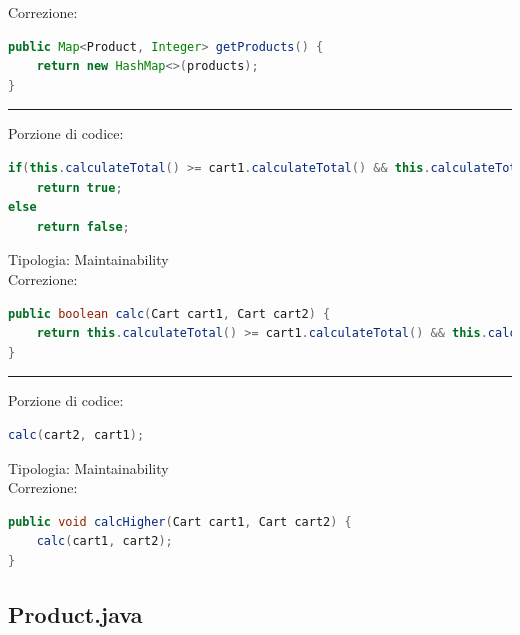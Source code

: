 \documentclass{article}
\begin{document}
Correzione: 
\begin{lstlisting}[language=Java]
public Map<Product, Integer> getProducts() {
    return new HashMap<>(products);
}
\end{lstlisting}
\vspace{.5em}\hrule\vspace{.5em}
Porzione di codice:
\begin{lstlisting}[language=Java]
if(this.calculateTotal() >= cart1.calculateTotal() && this.calculateTotal() >= cart2.calculateTotal())
    return true;
else 
    return false;
\end{lstlisting}
Tipologia: Maintainability\\
Correzione:
\begin{lstlisting}[language=Java]
public boolean calc(Cart cart1, Cart cart2) {
    return this.calculateTotal() >= cart1.calculateTotal() && this.calculateTotal() >= cart2.calculateTotal();
}
\end{lstlisting}
\vspace{.5em}\hrule\vspace{.5em}
Porzione di codice:
\begin{lstlisting}[language=Java]
calc(cart2, cart1);
\end{lstlisting}
Tipologia: Maintainability\\
Correzione:
\begin{lstlisting}[language=Java]
public void calcHigher(Cart cart1, Cart cart2) {
    calc(cart1, cart2);
}
\end{lstlisting}

\subsection{Product.java}
\end{document}
